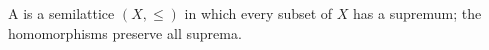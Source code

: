 A  is a semilattice $(X, \leqslant)$ in which every subset of $X$ has a supremum; the homomorphisms preserve all suprema.
